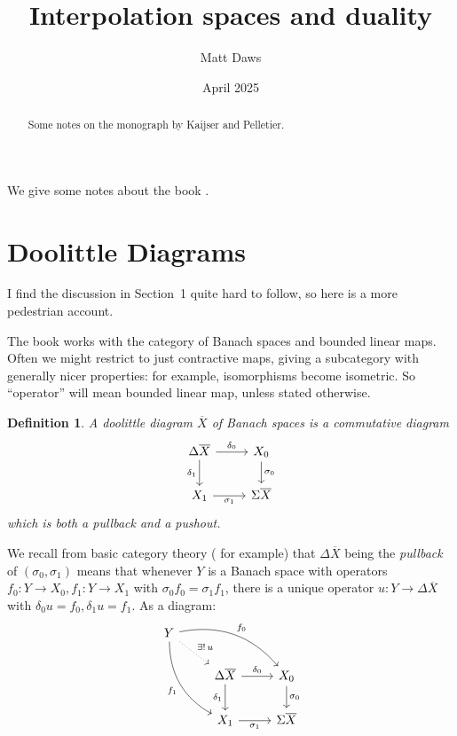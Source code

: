 \documentclass[a4paper,11pt]{article}
\theoremstyle{plain}
\newtheorem{definition}[proposition]{Definition}
\theoremstyle{remark}
\begin{document}
\title{Interpolation spaces and duality}
\author{Matt Daws}
\date{April 2025}
\maketitle

\begin{abstract}
Some notes on the monograph by Kaijser and Pelletier.
\end{abstract}

We give some notes about the book \cite{KP_InterpolationFunctorsDuality}.

\section{Doolittle Diagrams}

I find the discussion in Section~1 quite hard to follow, so here is a more pedestrian account.

The book works with the category of Banach spaces and bounded linear maps.  Often we might restrict to just contractive maps, giving a subcategory with generally nicer properties: for example, isomorphisms become isometric.  So ``operator'' will mean bounded linear map, unless stated otherwise.

\begin{definition}
A \emph{doolittle diagram} $\overline{X}$ of Banach spaces is a commutative diagram
\[ \begin{tikzcd}
\Delta\overline X \arrow[r, "\delta_0"] \arrow[d, "\delta_1"'] & X_0 \arrow[d, "\sigma_0"] \\
X_1 \arrow[r, "\sigma_1"'] & \Sigma\overline X
\end{tikzcd}
\]
which is both a pullback and a pushout.
\end{definition}

We recall from basic category theory (\cite[Definition~5.1.16]{Leinster_BasicCatTheory} for example) that $\Delta\overline X$ being the \emph{pullback} of $(\sigma_0, \sigma_1)$ means that whenever $Y$ is a Banach space with operators $f_0 \colon Y \to X_0, f_1 \colon Y \to X_1$ with $\sigma_0 f_0 = \sigma_1 f_1$, there is a unique operator $u\colon Y \to \Delta\overline X$ with $\delta_0 u = f_0, \delta_1 u = f_1$.  As a diagram:
\[ \begin{tikzcd}
Y \arrow[rd, dotted, "\exists !\, u"] \arrow[rrd, bend left, "f_0"] \arrow[rdd, bend right, "f_1"']\\
& \Delta\overline X \arrow[r, "\delta_0"] \arrow[d, "\delta_1"'] & X_0 \arrow[d, "\sigma_0"] \\
& X_1 \arrow[r, "\sigma_1"'] & \Sigma\overline X
\end{tikzcd}
\]
\end{document}
